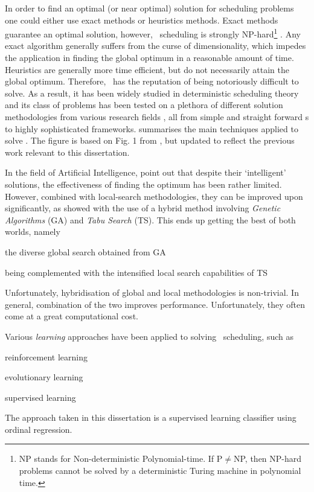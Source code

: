 In order to find an optimal (or near optimal) solution for scheduling problems 
one could either use exact methods or heuristics methods. Exact methods 
guarantee an optimal solution, however, \jsp\ scheduling is strongly 
NP-hard\footnote{NP stands for Non-deterministic Polynomial-time.
    If P$\neq$NP, then NP-hard problems cannot be solved by a deterministic 
    Turing machine in polynomial time.}
\citep{Garey76:NPhard}. Any exact algorithm generally suffers from the curse of 
dimensionality, which impedes the application in finding the global optimum in 
a reasonable amount of time. Heuristics are generally more time efficient, but 
do not necessarily attain the global optimum. Therefore, \JSP\ has the 
reputation of being notoriously difficult to solve. As a result, it has 
been widely studied in deterministic scheduling theory and its class of 
problems has been tested on a plethora of different solution methodologies from 
various research fields \citep{Meeran12}, all from simple and straight forward 
\dr s to highly sophisticated frameworks.
 summarises the main techniques applied to solve \JSP. The 
figure is based on Fig. 1 from \citet{Jain99}, but updated to reflect the 
previous work relevant to this dissertation.


In the field of Artificial Intelligence, \cite{Meeran12} point out that despite 
their `intelligent' solutions, the effectiveness of finding the optimum has 
been rather limited. However, combined with local-search methodologies, they 
can be improved upon significantly, as \citeauthor{Meeran12} showed with the 
use of a hybrid method involving \emph{Genetic Algorithms} (GA) and \emph{Tabu 
Search} (TS). 
This ends up getting the best of both worlds, namely
\begin{enumerate*}[label={{}}]
  \item the diverse global search obtained from GA 
  \item being complemented with the intensified local search capabilities of TS
\end{enumerate*}
Unfortunately, hybridisation of global and local methodologies is non-trivial. 
In general, combination of the two improves performance. Unfortunately, they 
often come at a great computational cost.  

Various \emph{learning} approaches have been applied to solving \jsp\ 
scheduling, such as
\begin{enumerate*}
  \item reinforcement learning \citep{Zhang95}
  \item evolutionary learning \citep{Tay08}
  \item supervised learning \citep{Siggi05,Malik08}
\end{enumerate*}
The approach taken in this 
dissertation is a supervised learning classifier using ordinal regression. 

